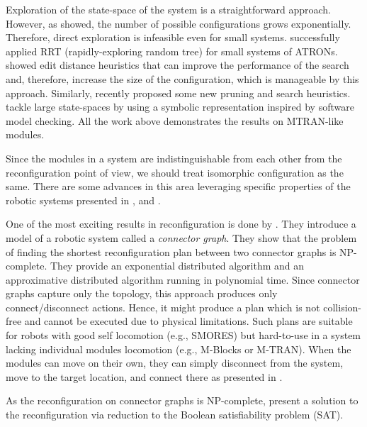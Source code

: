 Exploration of the state-space of the system is a straightforward approach.
However, as \textcite{DBLP:journals/jfr/ChirikjianPE96} showed, the number of
possible configurations grows exponentially. Therefore, direct exploration is
infeasible even for small systems. \textcite{DBLP:conf/iros/Brandt06}
successfully applied RRT (rapidly-exploring random tree) for small systems of
ATRONs. \textcite{DBLP:conf/iros/AsadpourASI09} showed edit distance heuristics
that can improve the performance of the search and, therefore, increase the size
of the configuration, which is manageable by this approach. Similarly,
\textcite{DBLP:journals/ral/KhodrMHBI19} recently proposed some new pruning and
search heuristics. \textcite{DBLP:conf/monterey/BaarirHKR10} tackle large
state-spaces by using a symbolic representation inspired by software model
checking. All the work above demonstrates the results on MTRAN-like modules.

Since the modules in a system are indistinguishable from each other from the
reconfiguration point of view, we should treat isomorphic configuration as the
same. There are some advances in this area leveraging specific properties of the
robotic systems presented in \textcite{DBLP:journals/ijrr/ParkCTY08},
\textcite{DBLP:conf/iros/AsadpourASI09} and
\textcite{DBLP:journals/ras/TaheriMAP16}.

One of the most exciting results in reconfiguration is done by
\textcite{DBLP:journals/ras/HouS14}. They introduce a model of a robotic system
called a \emph{connector graph}. They show that the problem of finding the
shortest reconfiguration plan between two connector graphs is NP-complete. They
provide an exponential distributed algorithm and an approximative
distributed algorithm running in polynomial time. Since
connector graphs capture only the topology, this approach produces only
connect/disconnect actions. Hence, it might produce a plan which is not
collision-free and cannot be executed due to physical limitations. Such plans
are suitable for robots with good self locomotion (e.g., SMORES) but hard-to-use
in a system lacking individual modules locomotion (e.g., M-Blocks or M-TRAN).
When the modules can move on their own, they can simply disconnect from the
system, move to the target location, and connect there as presented in
\cite{DBLP:journals/ral/LiuWY19}.

As the reconfiguration on connector graphs is NP-complete,
\textcite{DBLP:journals/pcs/GorbenkoP12} present a solution to the
reconfiguration via reduction to the Boolean satisfiability problem (SAT).


